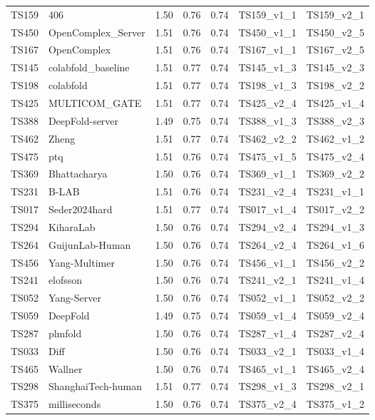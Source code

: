 \begin{longtable}{lllllll}
TS159 & 406 & 1.50 & 0.76 & 0.74 & TS159\_v1\_1 & TS159\_v2\_1 \\ 
TS450 & OpenComplex\_Server & 1.51 & 0.76 & 0.74 & TS450\_v1\_1 & TS450\_v2\_5 \\ 
TS167 & OpenComplex & 1.51 & 0.76 & 0.74 & TS167\_v1\_1 & TS167\_v2\_5 \\ 
TS145 & colabfold\_baseline & 1.51 & 0.77 & 0.74 & TS145\_v1\_3 & TS145\_v2\_3 \\ 
TS198 & colabfold & 1.51 & 0.77 & 0.74 & TS198\_v1\_3 & TS198\_v2\_2 \\ 
TS425 & MULTICOM\_GATE & 1.51 & 0.77 & 0.74 & TS425\_v2\_4 & TS425\_v1\_4 \\ 
TS388 & DeepFold-server & 1.49 & 0.75 & 0.74 & TS388\_v1\_3 & TS388\_v2\_3 \\ 
TS462 & Zheng & 1.51 & 0.77 & 0.74 & TS462\_v2\_2 & TS462\_v1\_2 \\ 
TS475 & ptq & 1.51 & 0.76 & 0.74 & TS475\_v1\_5 & TS475\_v2\_4 \\ 
TS369 & Bhattacharya & 1.50 & 0.76 & 0.74 & TS369\_v1\_1 & TS369\_v2\_2 \\ 
TS231 & B-LAB & 1.51 & 0.76 & 0.74 & TS231\_v2\_4 & TS231\_v1\_1 \\ 
TS017 & Seder2024hard & 1.51 & 0.77 & 0.74 & TS017\_v1\_4 & TS017\_v2\_2 \\ 
TS294 & KiharaLab & 1.50 & 0.76 & 0.74 & TS294\_v2\_4 & TS294\_v1\_3 \\ 
TS264 & GuijunLab-Human & 1.50 & 0.76 & 0.74 & TS264\_v2\_4 & TS264\_v1\_6 \\ 
TS456 & Yang-Multimer & 1.50 & 0.76 & 0.74 & TS456\_v1\_1 & TS456\_v2\_2 \\ 
TS241 & elofsson & 1.50 & 0.76 & 0.74 & TS241\_v2\_1 & TS241\_v1\_4 \\ 
TS052 & Yang-Server & 1.50 & 0.76 & 0.74 & TS052\_v1\_1 & TS052\_v2\_2 \\ 
TS059 & DeepFold & 1.49 & 0.75 & 0.74 & TS059\_v1\_4 & TS059\_v2\_4 \\ 
TS287 & plmfold & 1.50 & 0.76 & 0.74 & TS287\_v1\_4 & TS287\_v2\_4 \\ 
TS033 & Diff & 1.50 & 0.76 & 0.74 & TS033\_v2\_1 & TS033\_v1\_4 \\ 
TS465 & Wallner & 1.50 & 0.76 & 0.74 & TS465\_v1\_1 & TS465\_v2\_4 \\ 
TS298 & ShanghaiTech-human & 1.51 & 0.77 & 0.74 & TS298\_v1\_3 & TS298\_v2\_1 \\ 
TS375 & milliseconds & 1.50 & 0.76 & 0.74 & TS375\_v2\_4 & TS375\_v1\_2 \\ 

\end{longtable}

